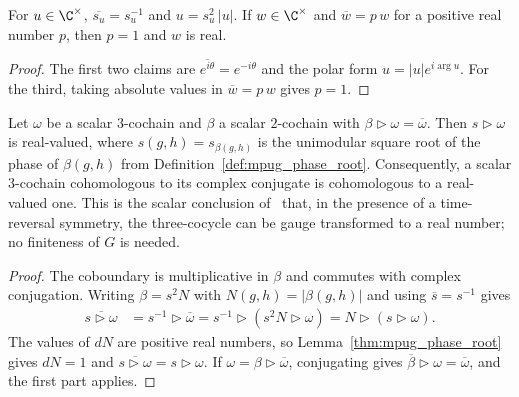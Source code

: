 \begin{lemma}
    \label{thm:mpug_phase_root}
    \leanok
    For $u\in\C^\times$, $\overline{s_u}=s_u^{-1}$ and $u=s_u^2\,|u|$. If
    $w\in\C^\times$ and $\overline w=p\,w$ for a positive real number $p$,
    then $p=1$ and $w$ is real.
\end{lemma}
\begin{proof}\leanok
    The first two claims are $\overline{e^{i\theta}}=e^{-i\theta}$ and the
    polar form $u=|u|e^{i\arg u}$. For the third, taking absolute values in
    $\overline w=p\,w$ gives $p=1$.
\end{proof}

\begin{lemma}
    \label{thm:mpug_time_reversal_real_anomaly}
    \leanok
    Let $\omega$ be a scalar $3$-cochain and $\beta$ a scalar $2$-cochain with
    $\beta\mathbin{\triangleright}\omega=\overline\omega$. Then
    $s\mathbin{\triangleright}\omega$ is real-valued, where
    $s(g,h)=s_{\beta(g,h)}$ is the unimodular square root of the phase of
    $\beta(g,h)$ from Definition~\ref{def:mpug_phase_root}. Consequently, a
    scalar $3$-cochain cohomologous to its complex conjugate is cohomologous
    to a real-valued one. This is the scalar conclusion
    of~\cite[Section~4.3]{GarreRubio2023MPOSym} that, in the presence of a
    time-reversal symmetry, the three-cocycle can be gauge transformed to a
    real number; no finiteness of $G$ is needed.
\end{lemma}
\begin{proof}\leanok
    The coboundary is multiplicative in $\beta$ and commutes with complex
    conjugation. Writing $\beta=s^2N$ with $N(g,h)=|\beta(g,h)|$ and using
    $\overline s=s^{-1}$ gives
    \begin{align}
        \overline{s\mathbin{\triangleright}\omega}
         & =s^{-1}\mathbin{\triangleright}\overline\omega
        =s^{-1}\mathbin{\triangleright}(s^2N\mathbin{\triangleright}\omega)
        =N\mathbin{\triangleright}(s\mathbin{\triangleright}\omega).
    \end{align}
    The values of $dN$ are positive real numbers, so
    Lemma~\ref{thm:mpug_phase_root} gives $dN=1$ and
    $\overline{s\mathbin{\triangleright}\omega}
        =s\mathbin{\triangleright}\omega$. If
    $\omega=\beta\mathbin{\triangleright}\overline\omega$, conjugating gives
    $\overline\beta\mathbin{\triangleright}\omega=\overline\omega$, and the
    first part applies.
\end{proof}

